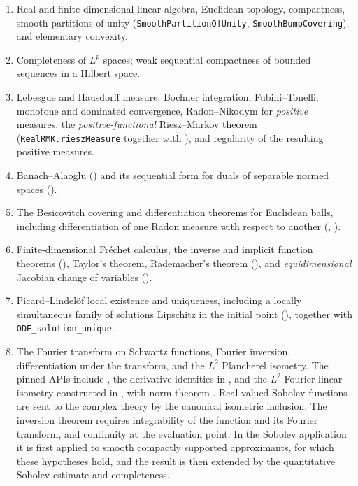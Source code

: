 \begin{enumerate}[label=(B\arabic*),leftmargin=*]
\item\label{base:linalg} Real and finite-dimensional linear algebra,
  Euclidean topology, compactness, smooth partitions of unity
  (\texttt{SmoothPartitionOfUnity}, \texttt{SmoothBumpCovering}), and
  elementary convexity.
\item\label{base:lp} Completeness of $L^p$ spaces; weak sequential
  compactness of bounded sequences in a Hilbert space.
\item\label{base:measure} Lebesgue and Hausdorff measure, Bochner
  integration, Fubini--Tonelli, monotone and dominated convergence,
  Radon--Nikodym for \emph{positive} measures, the \emph{positive-functional}
  Riesz--Markov theorem (\texttt{RealRMK.rieszMeasure} together with
  ), and regularity of the resulting
  positive measures.
\item\label{base:alaoglu} Banach--Alaoglu ()
  and its sequential form for duals of separable normed spaces
  ().
\item\label{base:besicovitch} The Besicovitch covering and differentiation
  theorems for Euclidean balls, including differentiation of one Radon
  measure with respect to another
  (,
  ).
\item\label{base:calculus} Finite-dimensional Fr\'echet calculus, the inverse
  and implicit function theorems
  (), Taylor's theorem,
  Rademacher's theorem (), and
  \emph{equidimensional} Jacobian change of variables
  ().
\item\label{base:ode} Picard--Lindel\"of local existence and uniqueness,
  including a locally simultaneous family of solutions Lipschitz in the
  initial point
  (),
  together with \texttt{ODE\_solution\_unique}.
\item\label{base:fourier} The Fourier transform on Schwartz functions,
  Fourier inversion, differentiation under the transform, and the $L^2$
  Plancherel isometry.  The pinned APIs include
  , the derivative
  identities in , and
  the $L^2$ Fourier linear isometry constructed in
  , with norm theorem
  .  Real-valued Sobolev functions
  are sent to the complex theory by the canonical isometric inclusion.
  The inversion theorem requires integrability of the function and its
  Fourier transform, and continuity at the evaluation point.  In the
  Sobolev application it is first applied to smooth compactly supported
  approximants, for which these hypotheses hold, and the result is then
  extended by the quantitative Sobolev estimate and completeness.
\end{enumerate}

